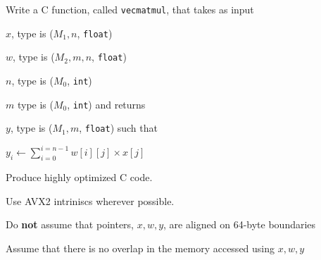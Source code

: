 \documentclass[letterpaper,12pt]{article}
\begin{document}



Write a C function, called {\tt vecmatmul}, that takes as input
\be
\item \(x\), type is (\(M_1, n\), {\tt float})
\item \(w\), type is (\(M_2, m, n\), {\tt float})
\item \(n\), type is (\(M_0\), {\tt int})
\item \(m\) type is (\(M_0\), {\tt int})
\ee
and returns 
\be
\item \(y\), type is (\(M_1, m\), {\tt float}) 
\ee
such that 
\be
\item \(y_i \leftarrow \sum_{i=0}^{i=n-1} w[i][j] \times x[j]\) \\ 
  \ee

  \be
\item Produce highly optimized C code.
\item Use AVX2 intriniscs wherever possible.
\item Do {\bf not} assume that pointers, \(x, w, y\), are aligned on 64-byte boundaries
\item Assume that there is no overlap in the memory accessed using \(x, w, y\)
  \ee
\end{document}

